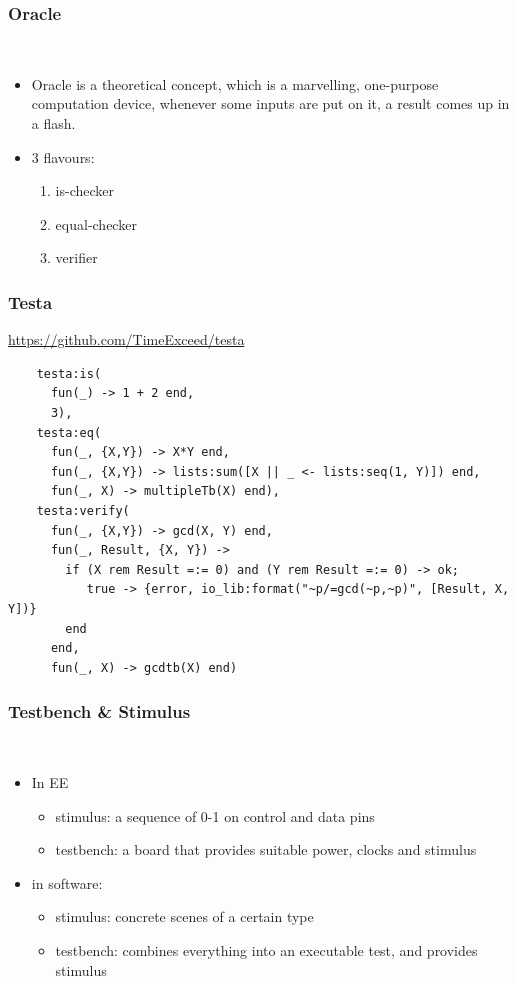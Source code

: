 \documentclass[lualatex]{beamer}
\begin{document}
\begin{frame}
  \frametitle{Oracle}

  \begin{block}{~}
    \begin{itemize}
    \item Oracle is a theoretical concept, which is a marvelling, one-purpose computation device, whenever some inputs are put on it, a result comes up in a flash.
    \item 3 flavours:
      \begin{enumerate}
      \item is-checker
      \item equal-checker
      \item verifier
      \end{enumerate}
    \end{itemize}
  \end{block}
\end{frame}

\begin{frame}[fragile]
  \frametitle{Testa}

  \url{https://github.com/TimeExceed/testa}

  \begin{verbatim}
    testa:is(
      fun(_) -> 1 + 2 end,
      3),
    testa:eq(
      fun(_, {X,Y}) -> X*Y end,
      fun(_, {X,Y}) -> lists:sum([X || _ <- lists:seq(1, Y)]) end,
      fun(_, X) -> multipleTb(X) end),
    testa:verify(
      fun(_, {X,Y}) -> gcd(X, Y) end,
      fun(_, Result, {X, Y}) ->
        if (X rem Result =:= 0) and (Y rem Result =:= 0) -> ok;
           true -> {error, io_lib:format("~p/=gcd(~p,~p)", [Result, X, Y])}
        end
      end,
      fun(_, X) -> gcdtb(X) end)
  \end{verbatim}
\end{frame}

\begin{frame}
  \frametitle{Testbench \& Stimulus}

  \begin{block}{~}
    \begin{itemize}
    \item In EE
      \begin{itemize}
      \item stimulus: a sequence of 0-1 on control and data pins
      \item testbench: a board that provides suitable power, clocks and stimulus
      \end{itemize}
    \item in software:
      \begin{itemize}
      \item stimulus: concrete scenes of a certain type
      \item testbench: combines everything into an executable test, and provides stimulus
      \end{itemize}
    \end{itemize}
  \end{block}
\end{frame}
\end{document}

